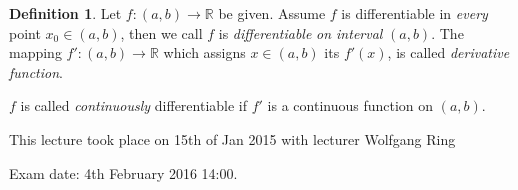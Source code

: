 \documentclass[a4paper,landscape,twocolumn]{article}
\theoremstyle{definition}
\newtheorem{defi}{Definition}
\newcommand\meta[3]{\begin{mdframed}[skipbelow=4pt,skipabove=4pt,innermargin=1pt,innerleftmargin=1pt,innerrightmargin=1pt]\begin{center}\small{\textdownarrow{} This #1 took place on #2 with lecturer #3}\end{center}\end{mdframed}}
\begin{document}
%
\begin{defi}
  Let $f: (a, b) \to \mathbb R$ be given. Assume $f$ is differentiable
  in \emph{every} point $x_0 \in (a, b)$, then we call $f$ is \emph{differentiable}
  \emph{on interval} $(a, b)$. The mapping $f': (a, b) \to \mathbb R$
  which assigns $x \in (a, b)$ its $f'(x)$, is called \emph{derivative function}.

  $f$ is called \emph{continuously} differentiable if $f'$ is a continuous function
  on $(a, b)$.
\end{defi}

\meta{lecture}{15th of Jan 2015}{Wolfgang Ring}
%
Exam date: 4th February 2016 14:00.

\end{document}
